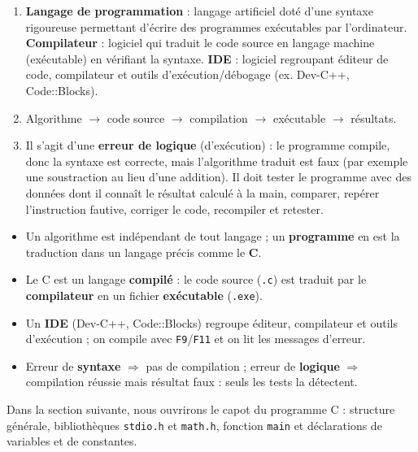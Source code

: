 \documentclass[11pt]{article}
\begin{document}
\begin{corrige}[Exercice 1]
\begin{enumerate}
\item \textbf{Langage de programmation} : langage artificiel doté d'une syntaxe rigoureuse permettant d'écrire des programmes exécutables par l'ordinateur. \textbf{Compilateur} : logiciel qui traduit le code source en langage machine (exécutable) en vérifiant la syntaxe. \textbf{IDE} : logiciel regroupant éditeur de code, compilateur et outils d'exécution/débogage (ex. Dev-C++, Code::Blocks).
\item Algorithme $\to$ code source $\to$ compilation $\to$ exécutable $\to$ résultats.
\item Il s'agit d'une \textbf{erreur de logique} (d'exécution) : le programme compile, donc la syntaxe est correcte, mais l'algorithme traduit est faux (par exemple une soustraction au lieu d'une addition). Il doit tester le programme avec des données dont il connaît le résultat calculé à la main, comparer, repérer l'instruction fautive, corriger le code, recompiler et retester.
\end{enumerate}
\end{corrige}

\begin{aretenir}
\begin{itemize}
\item Un algorithme est indépendant de tout langage ; un \textbf{programme} en est la traduction dans un langage précis comme le \textbf{C}.
\item Le C est un langage \textbf{compilé} : le code source (\texttt{.c}) est traduit par le \textbf{compilateur} en un fichier \textbf{exécutable} (\texttt{.exe}).
\item Un \textbf{IDE} (Dev-C++, Code::Blocks) regroupe éditeur, compilateur et outils d'exécution ; on compile avec \texttt{F9}/\texttt{F11} et on lit les messages d'erreur.
\item Erreur de \textbf{syntaxe} $\Rightarrow$ pas de compilation ; erreur de \textbf{logique} $\Rightarrow$ compilation réussie mais résultat faux : seuls les tests la détectent.
\end{itemize}
\end{aretenir}

Dans la section suivante, nous ouvrirons le capot du programme C : structure générale, bibliothèques \texttt{stdio.h} et \texttt{math.h}, fonction \texttt{main} et déclarations de variables et de constantes.
\end{document}
